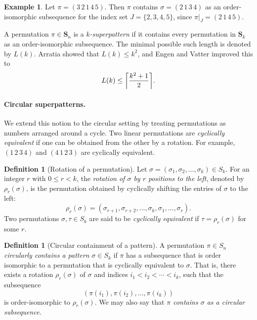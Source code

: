 \documentclass[a4paper,12pt]{article}
\theoremstyle{definition}
\newtheorem{definition}[theorem]{Definition}
\newtheorem{eg}[theorem]{Example}
\numberwithin{equation}{section}
\DeclarePairedDelimiter{\ceil}{\lceil}{\rceil}
\begin{document}
\begin{eg}
Let $\pi = (3\,2\,1\,4\,5)$. Then $\pi$ contains $\sigma = (2\,1\,3\,4)$ as an order-isomorphic subsequence for the index set $J = \{2,3,4,5\}$, since $\pi|_J =( 2\,1\,4\,5)$.
\end{eg}

A permutation $\pi \in \mathbf{S}_n$ is a \emph{$k$-superpattern} if it contains every permutation in $\mathbf{S}_k$ as an order-isomorphic subsequence.  The minimal possible such length is denoted by $L(k)$.  
Arratia showed that $L(k) \le k^2$, and Engen and Vatter improved this to 
\[
L(k) \le \ceil*{\frac{k^2+1}{2}}.
\]

\paragraph{Circular superpatterns.}
We extend this notion to the circular setting by treating permutations as numbers arranged around a cycle.  
Two linear permutations are \emph{cyclically equivalent} if one can be obtained from the other by a rotation.  
For example, $(1\,2\,3\,4)$ and $(4\,1\,2\,3)$ are cyclically equivalent. 

\begin{definition}[Rotation of a permutation]
Let $\sigma = (\sigma_1, \sigma_2, \ldots, \sigma_k) \in S_k$. 
For an integer $r$ with $0 \le r < k$, the \emph{rotation of $\sigma$ by $r$ positions to the left}, 
denoted by $\rho_r(\sigma)$, is the permutation obtained by cyclically shifting the entries of $\sigma$ to the left:
\[
\rho_r(\sigma) = (\sigma_{r+1}, \sigma_{r+2}, \ldots, \sigma_k, \sigma_1, \ldots, \sigma_r).
\]
Two permutations $\sigma, \tau \in S_k$ are said to be \emph{cyclically equivalent} if 
$\tau = \rho_r(\sigma)$ for some $r$.
\end{definition}

\begin{definition}[Circular containment of a pattern]
A permutation $\pi \in S_n$ \emph{circularly contains a pattern} $\sigma \in S_k$ 
if $\pi$ has a subsequence that is order isomorphic to a permutation that is cyclically equivalent to $\sigma$. That is, there exists a rotation $\rho_r(\sigma)$ of $\sigma$ and indices 
$ i_1 < i_2 < \cdots < i_k $, 
such that the subsequence 
\[
(\pi(i_1), \pi(i_2), \ldots, \pi(i_k))
\]
is order-isomorphic to $\rho_r(\sigma)$. We may also say that \emph{$\pi$ contains $\sigma$ as a circular subsequence.}
\end{definition}
\end{document}
